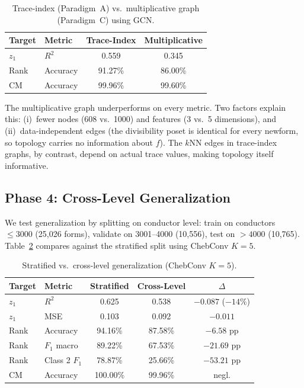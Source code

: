 \documentclass[11pt]{article}
\begin{document}
\begin{table}[t]
\centering
\caption{Trace-index (Paradigm~A) vs.\ multiplicative graph (Paradigm~C) using GCN.}
\label{tab:multiplicative}
\begin{tabular}{@{}llcc@{}}
\toprule
Target & Metric & Trace-Index & Multiplicative \\
\midrule
$z_1$ & $R^2$ & 0.559 & 0.345 \\
Rank & Accuracy & 91.27\% & 86.00\% \\
CM & Accuracy & 99.96\% & 99.60\% \\
\bottomrule
\end{tabular}
\end{table}

The multiplicative graph underperforms on every metric. Two factors explain this: (i)~fewer nodes (608 vs.\ 1000) and features (3 vs.\ 5 dimensions), and (ii)~data-independent edges (the divisibility poset is identical for every newform, so topology carries no information about $f$). The $k$NN edges in trace-index graphs, by contrast, depend on actual trace values, making topology itself informative.

\subsection{Phase 4: Cross-Level Generalization}

We test generalization by splitting on conductor level: train on conductors $\leq 3000$ (25,026 forms), validate on 3001--4000 (10,556), test on $>4000$ (10,765). Table~\ref{tab:cross-level} compares against the stratified split using ChebConv $K=5$.

\begin{table}[t]
\centering
\caption{Stratified vs.\ cross-level generalization (ChebConv $K{=}5$).}
\label{tab:cross-level}
\begin{tabular}{@{}llccc@{}}
\toprule
Target & Metric & Stratified & Cross-Level & $\Delta$ \\
\midrule
$z_1$ & $R^2$ & 0.625 & 0.538 & $-0.087$ ($-14\%$) \\
$z_1$ & MSE & 0.103 & 0.092 & $-0.011$ \\
Rank & Accuracy & 94.16\% & 87.58\% & $-6.58$ pp \\
Rank & $F_1$ macro & 89.22\% & 67.53\% & $-21.69$ pp \\
Rank & Class 2 $F_1$ & 78.87\% & 25.66\% & $-53.21$ pp \\
CM & Accuracy & 100.00\% & 99.96\% & negl. \\
\bottomrule
\end{tabular}
\end{table}
\end{document}
